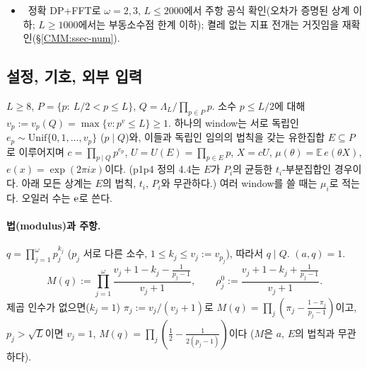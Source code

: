 \begin{itemize}[leftmargin=1.5em]
 정확히 이 지점이며(명제~\ref{CMM:prop-barrier}), $\omega(q)>N_1$이면 나쁜 원시 지표가 실제로 존재한다(명제~\ref{CMM:prop-badexist}).
 (명제~\ref{CMM:prop-badexist}는 ``모든 원시 지표가 좋다''는 경로만 막는다. 그런 나쁜 지표 하나의 기여는 $B(S)$에서 $\le\sqrt{q_S}/\varphi(q_S)$로 무시할 만하므로
 그것만으로는 이 절의 방법의 장애가 아니다. 절댓값 전개 자체의 장애는 AUD1 감사 절의 Parseval 하한을 보라.)
\item \NUMERIC\ 정확 DP+FFT로 $\omega=2,3$, $L\le2000$에서 주항 공식 확인(오차가 증명된 상계 이하; $L\ge1000$에서는 부동소수점 한계 이하);
 켤레 없는 지표 전개는 거짓임을 재확인(\S\ref{CMM:ssec-num}).
\end{itemize}

\subsection{설정, 기호, 외부 입력}\label{CMM:ssec-setup}

\begin{definition}\label{CMM:def-window}
$L\ge 8$, $P=\{p:\ L/2<p\le L\}$, $Q=\Lambda_L/\prod_{p\in P}p$. 소수 $p\le L/2$에 대해 $v_p:=v_p(Q)=\max\{v:p^v\le L\}\ge1$.
하나의 window는 서로 독립인 $e_p\sim\mathrm{Unif}\{0,1,\dots,v_p\}$ ($p\mid Q$)와, 이들과 독립인 임의의 법칙을 갖는
유한집합 $E\subseteq P$로 이루어지며 $c=\prod_{p\mid Q}p^{e_p}$, $U=U(E)=\prod_{p\in E}p$, $X=cU$,
$\mu(\theta)=\mathbb E\,e(\theta X)$, $e(x)=\exp(2\pi i x)$이다.
(p1p4 정의 4.4는 $E$가 $P_i$의 균등한 $t_i$-부분집합인 경우이다. 아래 모든 상계는 $E$의 법칙, $t_i$, $P_i$와 무관하다.)
여러 window를 쓸 때는 $\mu_i$로 적는다. 오일러 수는 $\mathrm{e}$로 쓴다.
\end{definition}

\paragraph{법(modulus)과 주항.}
$q=\prod_{j=1}^{\omega}p_j^{k_j}$ ($p_j$ 서로 다른 소수, $1\le k_j\le v_j:=v_{p_j}$), 따라서 $q\mid Q$. $(a,q)=1$.
\[
M(q):=\prod_{j=1}^{\omega}\frac{v_j+1-k_j-\frac1{p_j-1}}{v_j+1},\qquad
\rho^0_j:=\frac{v_j+1-k_j+\frac1{p_j-1}}{v_j+1}.
\]
제곱 인수가 없으면($k_j=1$) $\pi_j:=v_j/(v_j+1)$로 $M(q)=\prod_j(\pi_j-\frac{1-\pi_j}{p_j-1})$이고, $p_j>\sqrt L$이면 $v_j=1$,
$M(q)=\prod_j(\frac12-\frac1{2(p_j-1)})$이다 ($M$은 $a$, $E$의 법칙과 무관하다).

